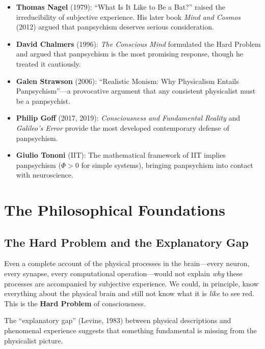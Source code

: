 \documentclass[11pt,a4paper]{report}
\begin{document}
\begin{itemize}[leftmargin=1.5em]
  \item \textbf{Thomas Nagel} (1979): ``What Is It Like to Be a Bat?'' raised the irreducibility of subjective experience. His later book \textit{Mind and Cosmos} (2012) argued that panpsychism deserves serious consideration.
  \item \textbf{David Chalmers} (1996): \textit{The Conscious Mind} formulated the Hard Problem and argued that panpsychism is the most promising response, though he treated it cautiously.
  \item \textbf{Galen Strawson} (2006): ``Realistic Monism: Why Physicalism Entails Panpsychism''---a provocative argument that any consistent physicalist must be a panpsychist.
  \item \textbf{Philip Goff} (2017, 2019): \textit{Consciousness and Fundamental Reality} and \textit{Galileo's Error} provide the most developed contemporary defense of panpsychism.
  \item \textbf{Giulio Tononi} (IIT): The mathematical framework of IIT implies panpsychism ($\Phi > 0$ for simple systems), bringing panpsychism into contact with neuroscience.
\end{itemize}


\chapter{The Philosophical Foundations}

\section{The Hard Problem and the Explanatory Gap}

\begin{argbox}
Even a complete account of the physical processes in the brain---every neuron, every synapse, every computational operation---would not explain \emph{why} these processes are accompanied by subjective experience. We could, in principle, know everything about the physical brain and still not know what it is \emph{like} to see red. This is the \textbf{Hard Problem} of consciousness.

The ``explanatory gap'' (Levine, 1983) between physical descriptions and phenomenal experience suggests that something fundamental is missing from the physicalist picture.
\end{argbox}
\end{document}
